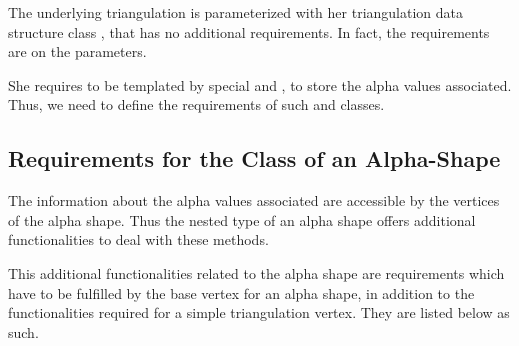 The underlying triangulation  is parameterized with her
triangulation data structure class , that has no additional
requirements. In fact, the requirements are on the  parameters.

She requires to be templated by special  and
, to store the alpha values associated. Thus, we need to
define the requirements of such  and
 classes.

\subsection{Requirements for the \protect {} Class of an
Alpha-Shape\label{I1_SectVertex}} 

The information about the alpha values associated  are accessible by the 
vertices of the alpha shape. Thus the nested 
type of an alpha shape offers additional functionalities to deal with these
methods. 

This additional functionalities related to the alpha shape
are requirements which have to be fulfilled
by the base vertex for an alpha shape,
in addition to the functionalities required for a simple triangulation vertex.
They are listed below as such.

\ccInheritsFrom



